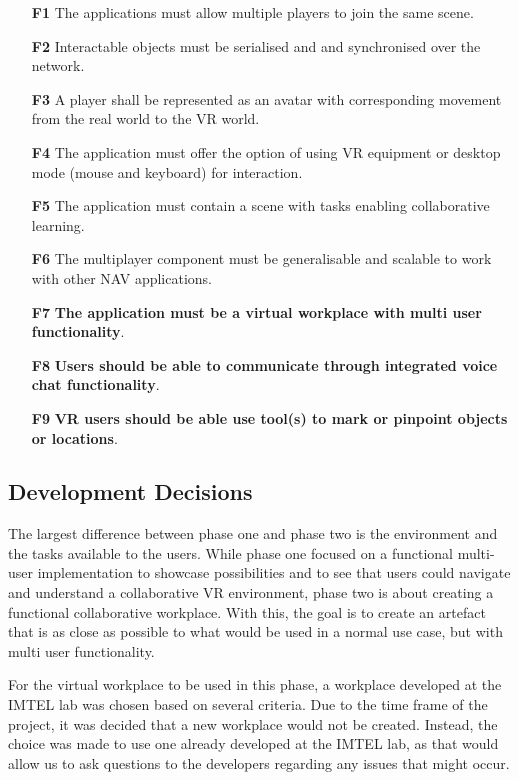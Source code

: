 \begin{enumerate}
  \setlength\itemsep{0em}
  \item [\textbf{F1}] The applications must allow multiple players to join the same scene.
  \item [\textbf{F2}] Interactable objects must be serialised and and synchronised over the network.
  \item [\textbf{F3}] A player shall be represented as an avatar with corresponding movement from the real world to the VR world.
  \item [\textbf{F4}] The application must offer the option of using VR equipment or desktop mode (mouse and keyboard) for interaction.
  \item [\textbf{F5}] The application must contain a scene with tasks enabling collaborative learning.
  \item [\textbf{F6}] The multiplayer component must be generalisable and scalable to work with other NAV applications.
  \item [\textbf{F7}] \textbf{The application must be a virtual workplace with multi user functionality}.
  \item [\textbf{F8}] \textbf{Users should be able to communicate through integrated voice chat functionality}.
   \item [\textbf{F9}] \textbf{VR users should be able use tool(s) to mark or pinpoint objects or locations}.
\end{enumerate}

\subsection{Development Decisions}
The largest difference between phase one and phase two is the environment and the tasks available to the users. While phase one focused on a functional multi-user implementation to showcase possibilities and to see that users could navigate and understand a collaborative VR environment, phase two is about creating a functional collaborative workplace. With this, the goal is to create an artefact that is as close as possible to what would be used in a normal use case, but with multi user functionality. 

For the virtual workplace to be used in this phase, a workplace developed at the IMTEL lab was chosen based on several criteria. Due to the time frame of the project, it was decided that a new workplace would not be created. Instead, the choice was made to use one already developed at the IMTEL lab, as that would allow us to ask questions to the developers regarding any issues that might occur. 

